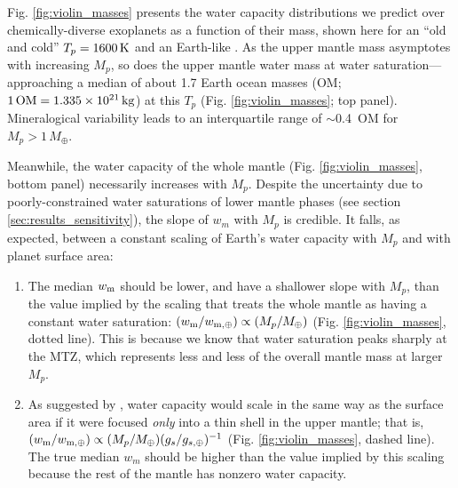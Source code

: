 Fig. \ref{fig:violin_masses} presents the water capacity distributions we predict over chemically-diverse exoplanets as a function of their mass, shown here for an ``old and cold'' $T_p = 1600\,{\rm K}$ and an Earth-like \coreeff. As the upper mantle mass asymptotes with increasing $M_p$, so does the upper mantle water mass at water saturation---approaching a median of about 1.7 Earth ocean masses (OM; $1\,{\rm OM} = 1.335\times 10^{21}\,{\rm kg}$) at this $T_p$ (Fig. \ref{fig:violin_masses}; top panel). Mineralogical variability leads to an interquartile range of $\sim$0.4~OM for $M_p > 1\, M_\oplus$. 

Meanwhile, the water capacity of the whole mantle (Fig. \ref{fig:violin_masses}, bottom panel) necessarily increases with $M_p$. Despite the uncertainty due to poorly-constrained water saturations of lower mantle phases (see section \ref{sec:results_sensitivity}), the slope of $w_m$ with $M_p$ is credible. It falls, as expected, between a constant scaling of Earth's water capacity with $M_p$ and with planet surface area: 

\begin{enumerate}
\item The median $w_{\rm m}$ should be lower, and have a shallower slope with $M_p$, than the value implied by the scaling that treats the whole mantle as having a constant water saturation: $(w_{\rm m}/w_{\rm m, \oplus}) \propto (M_p / M_\oplus)$ (Fig. \ref{fig:violin_masses}, dotted line). This is because we know that water saturation peaks sharply at the MTZ, which represents less and less of the overall mantle mass at larger $M_p$.



\item As suggested by \citet{cowan_water_2014}, water capacity would scale in the same way as the surface area if it were focused \textit{only} into a thin shell in the upper mantle; that is, $(w_{\rm m} / w_{\rm m, \oplus}) \propto (M_p / M_\oplus) (g_s/g_{s, \oplus})^{-1}$ (Fig. \ref{fig:violin_masses}, dashed line). The true median $w_m$ should be higher than the value implied by this scaling because the rest of the mantle has nonzero water capacity. 

\end{enumerate}

